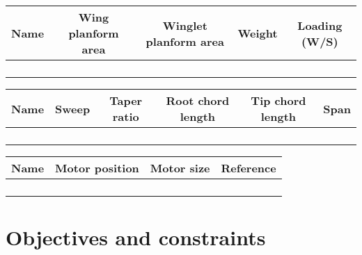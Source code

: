     \begin{table}[H]
        \begin{tabular}{|c|c|c|c|c|} %
            \hline \textbf{Name} & \textbf{Wing planform area} & \textbf{Winglet planform area} & \textbf{Weight} & \textbf{Loading (W/S)} \\ \hline %
             & & & & \\ \hline
             & & & & \\ \hline
             & & & & \\ \hline
             & & & & \\ \hline
        \end{tabular}
    \end{table}
    
    \begin{table}[H]
        \begin{tabular}{|c|c|c|c|c|c| } %
            \hline \textbf{Name} & \textbf{Sweep} & \textbf{Taper ratio} & \textbf{Root chord length} & \textbf{Tip chord length} & \textbf{Span} \\ \hline %
             & & & & & \\ \hline
             & & & & & \\ \hline
             & & & & & \\ \hline
             & & & & & \\ \hline
        \end{tabular}
    \end{table}
    
    \begin{table}[H]
        \begin{tabular}{|c|c|c|c| } %
            \hline \textbf{Name} & \textbf{Motor position} & \textbf{Motor size} & \textbf{Reference} \\ \hline %
             & & & \\ \hline
             & & & \\ \hline
             & & & \\ \hline
             & & & \\ \hline
        \end{tabular}
    \end{table}

\section{Objectives and constraints}



